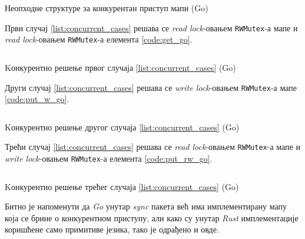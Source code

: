 \begin{listing}[H]
\inputminted{rust}{kodovi/repo.go}
\caption{Неопходне структуре за конкурентан приступ мапи {(Go)}}
\label{code:repo_go}
\end{listing}

Први случај \ref{list:concurrent_cases} решава се \textit{read lock}-овањем \texttt{RWMutex}-а мапе и \textit{read lock}-овањем \texttt{RWMutex}-а елемента  \ref{code:get_go}.\\

\begin{listing}[H]
\inputminted{go}{kodovi/get.go}
\caption{Kонкурентно решење првог случаја \ref{list:concurrent_cases} {(Go)}}
\label{code:get_go}
\end{listing}

Други случај \ref{list:concurrent_cases} решава се \textit{write lock}-овањем \texttt{RWMutex}-а мапе \ref{code:put_w_go}.\\

\begin{listing}[H]
\inputminted{go}{kodovi/put_w.go}
\caption{Kонкурентно решење другог случаја \ref{list:concurrent_cases} {(Go)}}
\label{code:put_w_go}
\end{listing}

Трећи случај \ref{list:concurrent_cases} решава се \textit{read lock}-овањем \texttt{RWMutex}-а мапе и \textit{write lock}-овањем \texttt{RWMutex}-а елемента  \ref{code:put_rw_go}.\\

\begin{listing}[H]
\inputminted{go}{kodovi/put_rw.go}
\caption{Kонкурентно решење трећег случаја \ref{list:concurrent_cases} {(Go)}}
\label{code:put_rw_go}
\end{listing}

Битно је напоменути да \textit{Go} унутар \textit{sync} пакета већ има имплементирану мапу која се брине о конкурентном приступу, али како су унутар \textit{Rust} имплементације коришћене само примитиве језика, тако је одрађено и овде.